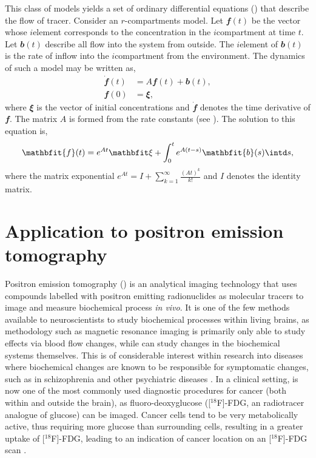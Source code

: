 This class of models yields a set of ordinary differential equations (\ode)
that describe the flow of tracer. Consider an $r$-compartments model. Let
$\mathbfit{f}(t)$ be the vector whose $i$\xth element corresponds to the
concentration in the $i$\xth compartment at time $t$. Let $\mathbfit{b}(t)$
describe all flow into the system from outside. The $i$\xth element of
$\mathbfit{b}(t)$ is the rate of inflow into the $i$\xth compartment from the
environment. The dynamics of such a model may be written as,
\begin{align*}
  \dot{\mathbfit{f}}(t) &= A\mathbfit{f}(t) + \mathbfit{b}(t), \\
  \mathbfit{f}(0) &= \mathbfit\xi,
\end{align*}
where $\mathbfit\xi$ is the vector of initial concentrations and
$\dot{\mathbfit{f}}$
denotes the time derivative of $\mathbfit{f}$. The matrix $A$ is formed from
the rate constants (see \cite{Gunn:2001cx}). The solution
\cite[][sec.~8.3.1]{Seber:2003vx} to this equation is,
\begin{equation*}
  \mathbfit{f}(t) = e^{A t}\mathbfit\xi +
  \int_0^t e^{A(t-s)}\mathbfit{b}(s)\intd s,
\end{equation*}
where the matrix exponential $e^{A t} = I + \sum_{k=1}^{\infty}
\frac{(At)^k}{k!}$ and $I$ denotes the identity matrix.

\section{Application to positron emission tomography}
\label{sec:Application to positron emission tomography}

Positron emission tomography (\pet) is an analytical imaging technology that
uses compounds labelled with positron emitting radionuclides as molecular
tracers to image and measure biochemical process \emph{in vivo}. It is one of
the few methods available to neuroscientists to study biochemical processes
within living brains, as methodology such as magnetic resonance imaging is
primarily only able to study effects via blood flow changes, while \pet can
study changes in the biochemical systems themselves. This is of considerable
interest within research into diseases where biochemical changes are known to
be responsible for symptomatic changes, such as in schizophrenia and other
psychiatric diseases \cite{FrankleL2002}.  In a clinical setting, \pet is now
one of the most commonly used diagnostic procedures for cancer (both within
and outside the brain), as fluoro-deoxyglucose ([$^{18}$F]-FDG, an radiotracer
analogue of glucose) can be imaged. Cancer cells tend to be very metabolically
active, thus requiring more glucose than surrounding cells, resulting in a
greater uptake of [$^{18}$F]-FDG, leading to an indication of cancer location
on an [$^{18}$F]-FDG scan \cite{Gambhir2002}.

